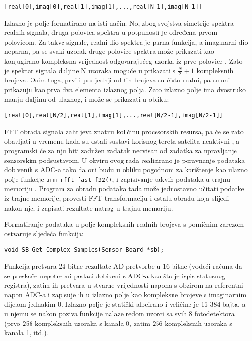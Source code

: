 \small
\begin{verbatim}
[real[0],imag[0],real[1],imag[1],...,real[N-1],imag[N-1]]
\end{verbatim}
\normalsize

Izlazno je polje formatirano na isti način. No, zbog svojstva simetrije spektra realnih signala, druga polovica spektra u potpunosti je određena prvom polovicom. Za takve signale, realni dio spektra je parna funkcija, a imaginarni dio neparna, pa se svaki uzorak druge polovice spektra može prikazati kao konjugirano-kompleksna vrijednost odgovarajućeg uzorka iz prve polovice \cite{petkovic_oos}. Zato je spektar signala duljine N uzoraka moguće u prikazati s $\frac{N}{2} + 1$ kompleksnih brojeva. Osim toga, prvi i posljednji od tih brojeva su čisto realni, pa se oni prikazuju kao prva dva elementa izlaznog polja. Zato izlazno polje ima dvostruko manju duljinu od ulaznog, i može se prikazati u obliku:

\small
\begin{verbatim}
[real[0],real[N/2],real[1],imag[1],...,real[N/2-1],imag[N/2-1]]
\end{verbatim}
\normalsize

FFT obrada signala zahtijeva znatnu količinu procesorskih resursa, pa će se zato obavljati u vremenu kada su ostali sustavi korisnog tereta satelita neaktivni , a programski će za nju biti zadužen zadatak neovisan od zadatka za upravljanje senzorskim podsustavom. U okviru ovog rada realizirano je poravnanje podataka dobivenih s ADC-a tako da oni budu u obliku pogodnom za korištenje kao ulazno polje funkcije \texttt{arm\_rfft\_fast\_f32()}, i zapisivanje takvih podataka u trajnu memoriju . Program za obradu podataka tada može jednostavno učitati podatke iz trajne memorije, provesti FFT transformaciju i ostalu obradu koja slijedi nakon nje, i zapisati rezultate natrag u trajnu memoriju.

Formatiranje podataka u polje kompleksnih realnih brojeva s pomičnim zarezom ostvaruje sljedeća funkcija:

\begin{lstlisting}[caption={Deklaracija funkcije \texttt{SB\_Get\_Complex\_Samples}}]
void SB_Get_Complex_Samples(Sensor_Board *sb);
\end{lstlisting}

Funkcija pretvara 24-bitne rezultate AD pretvorbe u 16-bitne (vodeći računa da se preskoče nepotrebni podaci dobiveni s ADC-a kao što je ispis statusnog registra), zatim ih pretvara u stvarne vrijednosti napona s obzirom na referentni napon ADC-a i zapisuje ih u izlazno polje kao kompleksne brojeve s imaginarnim dijelom jednakim 0. Izlazno polje je statički alocirano i veličine je 16 384 bajta, a u njemu se nakon poziva funkcije nalaze redom uzorci sa svih 8 fotodetektora (prvo 256 kompleksnih uzoraka s kanala 0, zatim 256 kompleksnih uzoraka s kanala 1, itd.).

